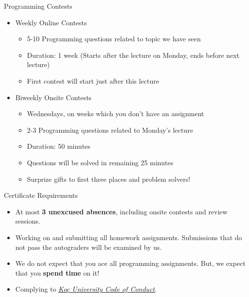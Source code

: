 		\begin{frame}{Programming Contests}
			\begin{itemize}
				\LARGE
				\item Weekly Online Contests
					\begin{itemize}
						\Large
						\item 5-10 Programming questions related to topic we have seen
						\item Duration: 1 week (Starts after the lecture on Monday, ends before next lecture)
						\item First contest will start just after this lecture
					\end{itemize}
				\item Biweekly Onsite Contests
					\begin{itemize}
						\Large
						\item Wednesdays, on weeks which you don't have an assignment
						\item 2-3 Programming questions related to Monday's lecture
						\item Duration: 50 minutes
						\item Questions will be solved in remaining 25 minutes
						\item Surprize gifts to first three places and problem solvers!
					\end{itemize}
			\end{itemize}
		\end{frame}

		\begin{frame}{Certificate Requirements}
			\begin{itemize}
				\LARGE
				\item At most \textbf{3 unexcused absences}, including onsite contests and review sessions.
				\item Working on and submitting all homework assignments. Submissions that do not pass the autograders will be examined by us.
				\item We do not expect that you ace all programming assignments. But, we expect that you \textbf{spend time} on it!
				\item Complying to \href{https://vpaa.ku.edu.tr/academic/student-code-of-conduct}{\underline{\textit{Koç University Code of Conduct}}}. 
			\end{itemize}
		\end{frame}


